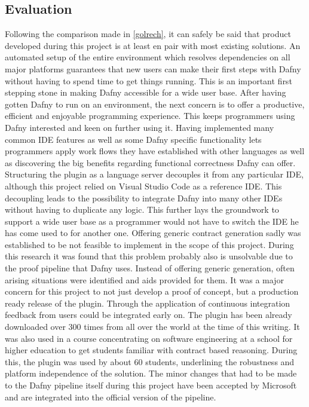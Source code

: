 \subsection{Evaluation}
Following the comparison made in \ref{golrech}, it can safely be said that product developed during this project is at least en pair with most existing solutions. An automated setup of the entire environment which resolves dependencies on all major platforms guarantees that new users can make their first steps with Dafny without having to spend time to get things running. This is an important first stepping stone in making Dafny accessible for a wide user base. \newline
After having gotten Dafny to run on an environment, the next concern is to offer a productive, efficient and enjoyable programming experience. This keeps programmers using Dafny interested and keen on further using it. Having implemented many common IDE features as well as some Dafny specific functionality lets programmers apply work flows they have established with other languages as well as discovering the big benefits regarding functional correctness Dafny can offer. \newline
Structuring the plugin as a language server decouples it from any particular IDE, although this project relied on Visual Studio Code as a reference IDE. This decoupling leads to the possibility to integrate Dafny into many other IDEs without having to duplicate any logic. This further lays the groundwork to support a wide user base as a programmer would not have to switch the IDE he has come used to for another one. \newline
Offering generic contract generation sadly was established to be not feasible to implement in the scope of this project. During this research it was found that this problem probably also is unsolvable due to the proof pipeline that Dafny uses. Instead of offering generic generation, often arising situations were identified and aids provided for them.\newline
It was a major concern for this project to not just develop a proof of concept, but a production ready release of the plugin. Through the application of continuous integration feedback from users could be integrated early on. The plugin has been already downloaded over 300 times from all over the world at the time of this writing. It was also used in a course concentrating on software engineering at a school for higher education to get students familiar with contract based reasoning. During this, the plugin was used by about 60 students, underlining the robustness and platform independence of the solution. The minor changes that had to be made to the Dafny pipeline itself during this project have been accepted by Microsoft and are integrated into the official version of the pipeline. \newline
